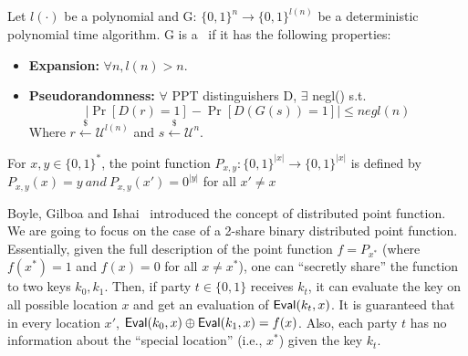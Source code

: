 \begin{definition}[PRG]
    Let $l(\cdot)$ be a polynomial and G: $ \{0,1\}^n \rightarrow \{0,1\}^{l(n)}$ be a deterministic
    polynomial time algorithm. G is a \Prg \ if it has the following properties:
    \hfill
    \begin{itemize}
        \item \textbf{Expansion:} $\forall n, l(n) > n$.
        \item \textbf{Pseudorandomness:} $\forall$ PPT distinguishers D, $\exists$ negl() s.t.
        $$\left|\Pr[D(r) = 1] - \Pr[D(G(s)) = 1]\right| \leq negl(n)$$ 
        Where $r \overset{{\scriptscriptstyle\$}}{\leftarrow} \mathcal{U}^{l(n)}$ and
        $s \overset{{\scriptscriptstyle\$}}{\leftarrow} \mathcal{U}^{n}$.
    \end{itemize}
\end{definition}


\begin{notation}
    For $x,y \in\{0,1\}^*$, the point function $P_{x,y}:\{0,1\}^{|{x}|} \rightarrow \{0,1\}^{|{x}|}$
    is defined by $P_{x,y}(x) = y \ and \ P_{x,y}(x') = 0^{|y|}$ for all $x' \neq x$
\end{notation}

Boyle, Gilboa and Ishai~\cite{boyle2016function} introduced the concept of distributed point function. 
We are going to focus on the case of a 2-share binary distributed point function. 
Essentially, given the full description of the point function $f=P_{x^*}$ (where $f(x^*)=1$ and $f(x)=0$ for all $x\ne x^*$), one can ``secretly share'' the function to two keys $k_0,k_1$. Then, if party $t\in\{0,1\}$ receives $k_t$, it can evaluate the key on all possible location $x$ and get an evaluation of ${\sf Eval}(k_t, x)$. 
It is guaranteed that in every location $x'$, ${\sf Eval}(k_0, x)\oplus{\sf Eval}(k_1, x)=f(x)$.
Also, each party $t$ has no information about the ``special location'' (i.e., $x^*$) given the key $k_t$.


